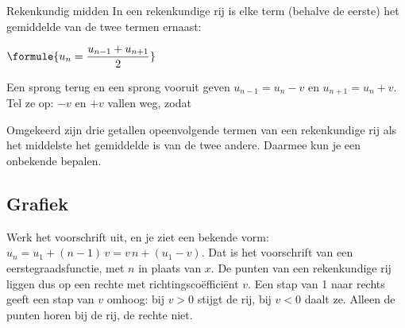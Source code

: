 \begin{theorie}
\begin{stelling}{Rekenkundig midden}
In een rekenkundige rij is elke term (behalve de eerste) het gemiddelde van de twee termen ernaast:

\vspace{1mm}
\qquad $\formule{u_n = \dfrac{u_{n-1} + u_{n+1}}{2}}$
\end{stelling}

\begin{bewijs}
Een sprong terug en een sprong vooruit geven $u_{n-1} = u_n - v$ en $u_{n+1} = u_n + v$. Tel ze op: $-v$ en $+v$ vallen weg, zodat
\end{bewijs}
\end{theorie}

Omgekeerd zijn drie getallen opeenvolgende termen van een rekenkundige rij als het middelste het gemiddelde is van de twee andere. Daarmee kun je een onbekende bepalen.


\begin{oefeningen}
\end{oefeningen}

\subsection{Grafiek}

Werk het voorschrift uit, en je ziet een bekende vorm: $u_n = u_1 + (n-1)\,v = v\,n + (u_1 - v)$. Dat is het voorschrift van een eerstegraadsfunctie, met $n$ in plaats van $x$. De punten van een rekenkundige rij liggen dus op een rechte met richtingscoëfficiënt $v$. Een stap van 1 naar rechts geeft een stap van $v$ omhoog: bij $v > 0$ stijgt de rij, bij $v < 0$ daalt ze. Alleen de punten horen bij de rij, de rechte niet.

